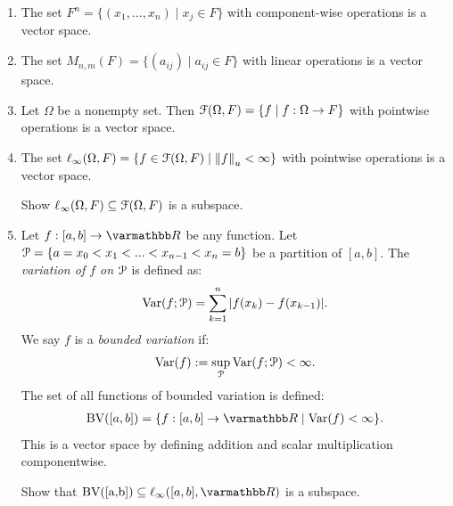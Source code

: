     \begin{example}
        \phantom{a}
        \begin{enumerate}[label = (\arabic*),itemsep=1pt,topsep=3pt]
            \item The set $F^n = \{(x_1,...,x_n) \mid x_j \in F\}$ with component-wise operations is a vector space.
            \item The set $M_{n,m}(F) = \{(a_{ij}) \mid a_{ij} \in F\}$ with linear operations is a vector space.
            \item Let $\Omega$ be a nonempty set. Then $\mathcal{F}(\Omega,F) = \{f \mid f:\Omega \rightarrow F\}$ with pointwise operations is a vector space.
            \item The set $\ell_\infty(\Omega,F) = \{f \in \mathcal{F}(\Omega,F) \mid \left\lVert f \right\rVert _u < \infty \}$ with pointwise operations is a vector space.
                \begin{exercise}
                    Show $\ell_\infty(\Omega,F) \subseteq \mathcal{F}(\Omega,F)$ is a subspace.
                \end{exercise}

            \item Let $f:[a,b] \rightarrow \bfR$ be any function. Let $\mathcal{P} = \{a = x_0 < x_1 < ... < x_{n-1} < x_n = b\}$ be a partition of $[a,b]$. The \textit{variation of $f$ on $\mathcal{P}$} is defined as:
            \begin{equation*}
            \begin{split}
                \text{Var}(f;\mathcal{P}) = \sum_{k = 1}^n |f(x_k) - f(x_{k-1})|.
            \end{split}
            \end{equation*}
        We say $f$ is a \textit{bounded variation} if:
            \begin{equation*}
            \begin{split}
                \text{Var}(f) := \sup_{\mathcal{P}}\text{Var}(f;\mathcal{P}) < \infty.
            \end{split}
            \end{equation*}
        The set of all functions of bounded variation is defined:
            \begin{equation*}
            \begin{split}
                \text{BV}([a,b]) = \{f:[a,b] \rightarrow \bfR \mid \text{Var}(f) < \infty\}.
            \end{split}
            \end{equation*}
        This is a vector space by defining addition and scalar multiplication componentwise.
            \begin{exercise}\label{ex:bv-subspace}
                Show that $\text{BV([a,b])} \subseteq \ell_\infty([a,b],\bfR)$ is a subspace.
            \end{exercise}


\end{enumerate}
\end{example}
